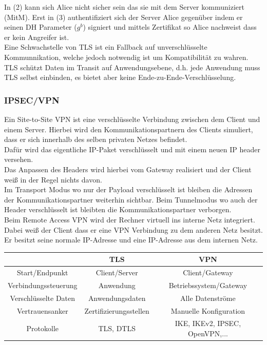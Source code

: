 \documentclass[a4paper,12pt,leqno]{article}
\begin{document}
In (2) kann sich Alice nicht sicher sein das sie mit dem Server kommuniziert (MitM). Erst in (3) authentifiziert sich der Server Alice gegenüber indem er seinen DH Parameter ($g^b$) signiert und mittels Zertifikat so Alice nachweist dass er kein Angreifer ist.\\
Eine Schwachstelle von TLS ist ein Fallback auf unverschlüsselte Kommunnikation, welche jedoch notwendig ist um Kompatibilität zu wahren.\\

TLS schützt Daten im Transit auf Anwendungsebene, d.h. jede Anwendung muss TLS selbst einbinden, es bietet aber keine Ende-zu-Ende-Verschlüsselung.

\subsubsection{IPSEC/VPN}

Ein Site-to-Site VPN ist eine verschlüsselte Verbindung zwischen dem Client und einem Server. Hierbei wird den Kommunikationspartnern des Clients simuliert, dass er sich innerhalb des selben privaten Netzes befindet.\\
Dafür wird das eigentliche IP-Paket verschlüsselt und mit einem neuen IP header versehen.\\
Das Anpassen des Headers wird hierbei vom Gateway realisiert und der Client weiß in der Regel nichts davon.\\

Im Transport Modus wo nur der Payload verschlüsselt ist bleiben die Adressen der Kommunikationspartner weiterhin sichtbar. Beim Tunnelmodus wo auch der Header verschlüsselt ist bleibten die Kommunikationspartner verborgen.\\

Beim Remote Access VPN wird der Rechner virtuell ins interne Netz integriert. Dabei weiß der Client dass er eine VPN Verbindung zu dem anderen Netz besitzt. Er besitzt seine normale IP-Adresse und eine IP-Adresse aus dem internen Netz.\\

\begin{tabular}{|c|c|c|}
\hline
& TLS & VPN\\
\hline
Start/Endpunkt & Client/Server & Client/Gateway\\
Verbindungssteuerung & Anwendung & Betriebssystem/Gateway\\
Verschlüsselte Daten & Anwendungsdaten & Alle Datenströme\\
Vertrauensanker & Zertifizierungsstellen & Manuelle Konfiguration\\
Protokolle & TLS, DTLS & IKE, IKEv2, IPSEC, OpenVPN,... \\
\hline
\end{tabular}
\end{document}
